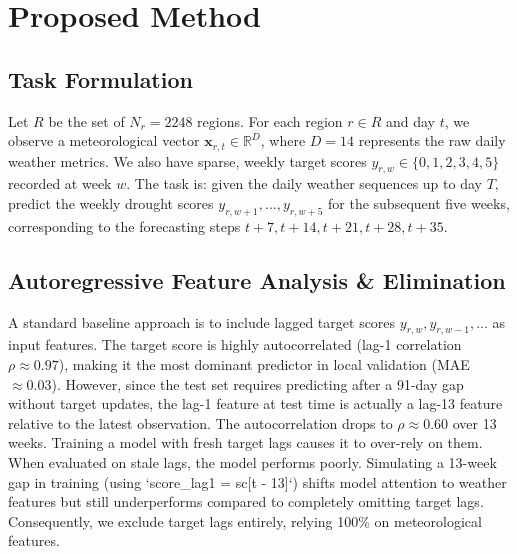 \documentclass[conference]{IEEEtran}
\begin{document}
\section{Proposed Method}

\subsection{Task Formulation}
Let $R$ be the set of $N_r = 2248$ regions. For each region $r \in R$ and day $t$, we observe a meteorological vector $\mathbf{x}_{r, t} \in \mathbb{R}^{D}$, where $D=14$ represents the raw daily weather metrics. We also have sparse, weekly target scores $y_{r, w} \in \{0, 1, 2, 3, 4, 5\}$ recorded at week $w$. 
The task is: given the daily weather sequences up to day $T$, predict the weekly drought scores $y_{r, w+1}, \dots, y_{r, w+5}$ for the subsequent five weeks, corresponding to the forecasting steps $t+7, t+14, t+21, t+28, t+35$.

\subsection{Autoregressive Feature Analysis \& Elimination}
A standard baseline approach is to include lagged target scores $y_{r, w}, y_{r, w-1}, \dots$ as input features. The target score is highly autocorrelated (lag-1 correlation $\rho \approx 0.97$), making it the most dominant predictor in local validation (MAE $\approx 0.03$). However, since the test set requires predicting after a 91-day gap without target updates, the lag-1 feature at test time is actually a lag-13 feature relative to the latest observation. The autocorrelation drops to $\rho \approx 0.60$ over 13 weeks. 
Training a model with fresh target lags causes it to over-rely on them. When evaluated on stale lags, the model performs poorly. Simulating a 13-week gap in training (using `score\_lag1 = sc[t - 13]`) shifts model attention to weather features but still underperforms compared to completely omitting target lags. Consequently, we exclude target lags entirely, relying 100\% on meteorological features.
\end{document}
